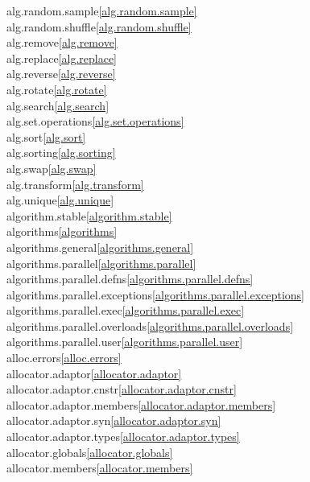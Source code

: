 \begin{multicols}{2}
alg.random.sample\quad\ref{alg.random.sample}\\
alg.random.shuffle\quad\ref{alg.random.shuffle}\\
alg.remove\quad\ref{alg.remove}\\
alg.replace\quad\ref{alg.replace}\\
alg.reverse\quad\ref{alg.reverse}\\
alg.rotate\quad\ref{alg.rotate}\\
alg.search\quad\ref{alg.search}\\
alg.set.operations\quad\ref{alg.set.operations}\\
alg.sort\quad\ref{alg.sort}\\
alg.sorting\quad\ref{alg.sorting}\\
alg.swap\quad\ref{alg.swap}\\
alg.transform\quad\ref{alg.transform}\\
alg.unique\quad\ref{alg.unique}\\
algorithm.stable\quad\ref{algorithm.stable}\\
algorithms\quad\ref{algorithms}\\
algorithms.general\quad\ref{algorithms.general}\\
algorithms.parallel\quad\ref{algorithms.parallel}\\
algorithms.parallel.defns\quad\ref{algorithms.parallel.defns}\\
algorithms.parallel.exceptions\quad\ref{algorithms.parallel.exceptions}\\
algorithms.parallel.exec\quad\ref{algorithms.parallel.exec}\\
algorithms.parallel.overloads\quad\ref{algorithms.parallel.overloads}\\
algorithms.parallel.user\quad\ref{algorithms.parallel.user}\\
alloc.errors\quad\ref{alloc.errors}\\
allocator.adaptor\quad\ref{allocator.adaptor}\\
allocator.adaptor.cnstr\quad\ref{allocator.adaptor.cnstr}\\
allocator.adaptor.members\quad\ref{allocator.adaptor.members}\\
allocator.adaptor.syn\quad\ref{allocator.adaptor.syn}\\
allocator.adaptor.types\quad\ref{allocator.adaptor.types}\\
allocator.globals\quad\ref{allocator.globals}\\
allocator.members\quad\ref{allocator.members}\\

\end{multicols}
